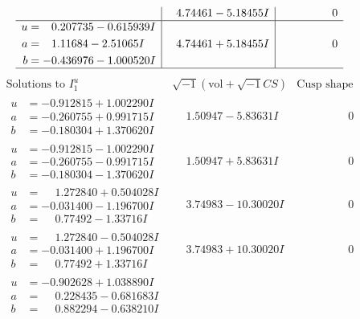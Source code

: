 \documentclass[1p]{elsarticle_modified}
\theoremstyle{definition}
\newcommand{\I}{\sqrt{-1}}
\begin{document}
$$\begin{array}{c|c|c}
 & \phantom{-}4.74461 - 5.18455 I & \phantom{-0.000000 } 0 \\ \hline\begin{aligned}
u &= \phantom{-}0.207735 - 0.615939 I \\
a &= \phantom{-}1.11684 - 2.51065 I \\
b &= -0.436976 - 1.000520 I\end{aligned}
 & \phantom{-}4.74461 + 5.18455 I & \phantom{-0.000000 } 0\\
 \hline 
 \end{array}$$\newpage$$\begin{array}{c|c|c}  
\text{Solutions to }I^u_{1}& \I (\text{vol} + \sqrt{-1}CS) & \text{Cusp shape}\\
 \hline 
\begin{aligned}
u &= -0.912815 + 1.002290 I \\
a &= -0.260755 + 0.991715 I \\
b &= -0.180304 + 1.370620 I\end{aligned}
 & \phantom{-}1.50947 - 5.83631 I & \phantom{-0.000000 } 0 \\ \hline\begin{aligned}
u &= -0.912815 - 1.002290 I \\
a &= -0.260755 - 0.991715 I \\
b &= -0.180304 - 1.370620 I\end{aligned}
 & \phantom{-}1.50947 + 5.83631 I & \phantom{-0.000000 } 0 \\ \hline\begin{aligned}
u &= \phantom{-}1.272840 + 0.504028 I \\
a &= -0.031400 - 1.196700 I \\
b &= \phantom{-}0.77492 - 1.33716 I\end{aligned}
 & \phantom{-}3.74983 - 10.30020 I & \phantom{-0.000000 } 0 \\ \hline\begin{aligned}
u &= \phantom{-}1.272840 - 0.504028 I \\
a &= -0.031400 + 1.196700 I \\
b &= \phantom{-}0.77492 + 1.33716 I\end{aligned}
 & \phantom{-}3.74983 + 10.30020 I & \phantom{-0.000000 } 0 \\ \hline\begin{aligned}
u &= -0.902628 + 1.038890 I \\
a &= \phantom{-}0.228435 - 0.681683 I \\
b &= \phantom{-}0.882294 - 0.638210 I\end{aligned}

\end{array}$$
\end{document}
